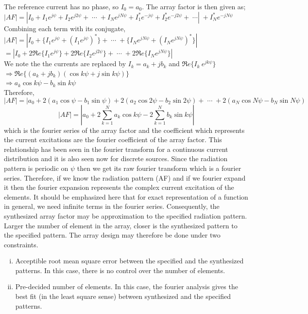The reference current has no phase, so $I_0 = a_0$. The array factor is then given as;\\
$|AF| = |I_0 + I_1 e^{j\psi} + I_2 e^{j2\psi} + \; \cdots \; + I_N e^{jN\psi} + I_1^\ast e^{-j\psi} + I_2^\ast e^{-j2\psi} + \; \cdots|\; + I_N^\ast e^{-jN\psi}$\\
Combining each term with its conjugate,\\
$|AF| = |I_0 + \{I_1 e^{j\psi} + (I_1 e^{j\psi})^\ast\} + \; \cdots \; + \{I_N e^{jN\psi} + (I_N e^{jN\psi})^\ast\}|$\\
$= |I_0 + 2\Re e\{I_1 e^{j\psi}\} + 2\Re e\{I_2 e^{j2\psi}\} + \; \cdots \; + 2\Re e\{I_N e^{jN\psi}\}|$\\
We note the the currents are replaced by $I_k = a_k + jb_k $ and $\Re e\{I_k\ e^{jk\psi}\}$\\
$\Rightarrow \Re e\{(a_k + jb_k)(\cos k\psi + j\sin k\psi)\}$\\
$\Rightarrow a_k\cos k\psi - b_k\sin k\psi$\\
Therefore,
\begin{dmath*}
|AF| = |a_0 + 2(a_1\cos\psi - b_1\sin\psi) + 2(a_2\cos2\psi - b_2\sin 2\psi) + \; \cdots \; + 2(a_N\cos N\psi - b_N\sin N\psi)
\end{dmath*}
\begin{dmath}
|AF| = \left|a_0 + 2\sum_{k=1}^{N} a_k\cos k\psi -2\sum_{k=1}^{N}b_k\sin k\psi\right|
\label{eqn56}
\end{dmath}
which is the fourier series of the array factor and the coefficient which represents the current excitations are the fourier coefficient of the array factor. This relationship has been seen in the fourier transform for a continuous current distribution and it is also seen now for discrete sources. Since the radiation pattern is periodic on $\psi$ then we get its raw fourier transform which is a fourier series. Therefore, if we know the radiation pattern (AF) and if we fourier expand it then the fourier expansion represents the complex current excitation of the elements. It should be emphasized here that for exact representation of a function in general, we need infinite terms in the fourier series. Consequently, the synthesized array factor may be  approximation  to the specified radiation pattern. Larger the number of element in the array, closer is the synthesized pattern to the specified pattern. The array design may therefore be done under two constraints.
\begin{enumerate}[(i)]
\item Acceptible root mean square error between the specified and the synthesized patterns. In this case, there is no control over the number of elements.
\item Pre-decided number of elements. In this case, the fourier analysis gives the best fit (in the least square sense) between synthesized and the specified patterns.
\end{enumerate}
